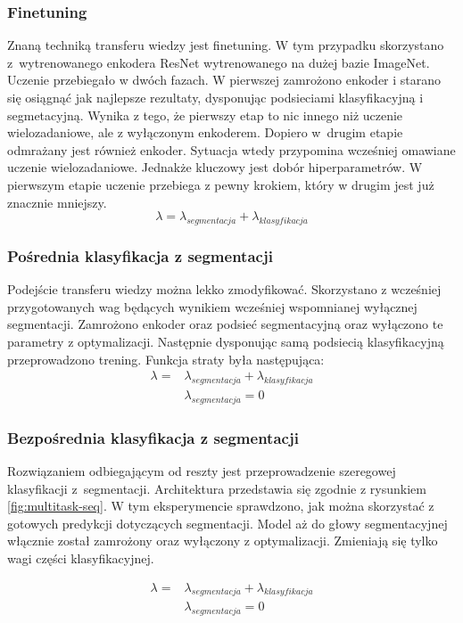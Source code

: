 \subsubsection{Finetuning}
Znaną techniką transferu wiedzy jest finetuning. W tym przypadku skorzystano z~wytrenowanego enkodera ResNet wytrenowanego na dużej bazie ImageNet. Uczenie przebiegało w dwóch fazach. W pierwszej zamrożono enkoder i starano się osiągnąć jak najlepsze rezultaty, dysponując podsieciami klasyfikacyjną i segmetacyjną. Wynika z tego, że pierwszy etap to nic innego niż uczenie wielozadaniowe, ale z wyłączonym enkoderem. Dopiero w~drugim etapie odmrażany jest również enkoder. Sytuacja wtedy przypomina wcześniej omawiane uczenie wielozadaniowe. Jednakże kluczowy jest dobór hiperparametrów. W pierwszym etapie uczenie przebiega z pewny krokiem, który w drugim jest już znacznie mniejszy.
\begin{equation*}
\lambda = \lambda_{segmentacja} + \lambda_{klasyfikacja}
\end{equation*}
\subsubsection{Pośrednia klasyfikacja z segmentacji}
Podejście transferu wiedzy można lekko zmodyfikować. Skorzystano z wcześniej przygotowanych wag będących wynikiem wcześniej wspomnianej wyłącznej segmentacji. Zamrożono enkoder oraz podsieć segmentacyjną oraz wyłączono te parametry z optymalizacji. Następnie dysponując samą podsiecią klasyfikacyjną przeprowadzono trening. Funkcja straty była następująca:
\begin{align*}
\lambda  = & \lambda_{segmentacja} + \lambda_{klasyfikacja} \\
           & \lambda_{segmentacja} = 0
\end{align*}
\subsubsection{Bezpośrednia klasyfikacja z segmentacji}
Rozwiązaniem odbiegającym od reszty jest przeprowadzenie szeregowej klasyfikacji z~segmentacji. Architektura przedstawia się zgodnie z rysunkiem \ref{fig:multitask-seq}. W tym eksperymencie sprawdzono, jak można skorzystać z gotowych predykcji dotyczących segmentacji. Model aż do głowy segmentacyjnej włącznie został zamrożony oraz wyłączony z optymalizacji. Zmieniają się tylko wagi części klasyfikacyjnej.

\begin{align*}
\lambda  = & \lambda_{segmentacja} + \lambda_{klasyfikacja} \\
           & \lambda_{segmentacja} = 0
\end{align*}





